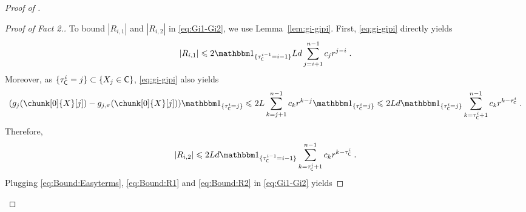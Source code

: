 \documentclass[leqno,11pt,a4paper]{article}
\begin{document}
\begin{proof}[Proof of ]
\begin{proof}[Proof of Fact 2.]
To bound $|R_{i,1}|$ and $|R_{i,2}|$ in \eqref{eq:Gi1-Gi2}, we use Lemma~\ref{lem:gi-gipi}.
First, \eqref{eq:gi-gipi} directly yields
\begin{equation}\label{eq:Bound:R1}
|R_{i,1}|\leqslant 2\indiacc{\tau_{\cC}^{i-1}=i-1}Ld\sum_{j=i+1}^{n-1}c_jr^{j-i}\eqsp.
\end{equation}
Moreover, as $\{\tau_{\mathsf{C}}^i=j\}\subset \{X_j\in \mathsf{C}\}$, \eqref{eq:gi-gipi} also yields
\[
(g_j(\chunk[0]{X}[j])-g_{j,\pi}(\chunk[0]{X}[j]))\indiacc{\tau_{\cC}^i=j}\leqslant 2L\sum_{k=j+1}^{n-1}c_kr^{k-j}\indiacc{\tau_{\cC}^i=j}\leqslant 2Ld\indiacc{\tau_{\cC}^i=j}\sum_{k=\tau_{\cC}^i+1}^{n-1}c_kr^{k-\tau_{\cC}^i}\eqsp.
\]
Therefore,
\begin{equation}\label{eq:Bound:R2}
|R_{i,2}|\leqslant 2Ld\indiacc{\tau_{\cC}^{i-1}=i-1}\sum_{k=\tau_{\cC}^i+1}^{n-1}c_kr^{k-\tau_{\cC}^i}\eqsp.
\end{equation}
Plugging \eqref{eq:Bound:Easyterms}, \eqref{eq:Bound:R1} and \eqref{eq:Bound:R2} in \eqref{eq:Gi1-Gi2} yields

\end{proof}
\end{proof}
\end{document}
